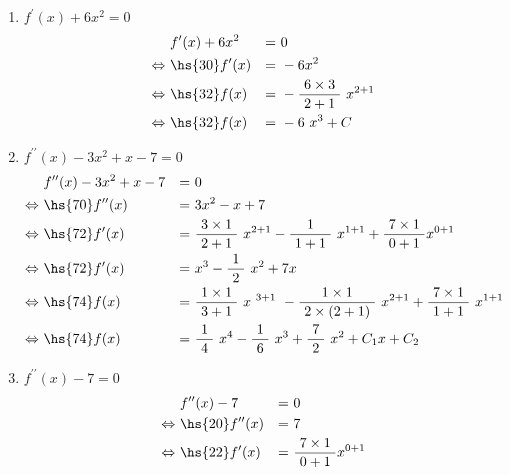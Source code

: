 \documentclass[a4paper,11pt]{ltjsarticle}
\begin{document}
\begin{enumerate}
  \item $f^{\prime}(x)+6x^{2}=0$
\begin{equation*}
  \begin{aligned}
                   \ & f^{\prime}(x)+6x^{2}  &=&\ 0 \\
    \Leftrightarrow\ & \hs{30} f^{\prime}(x) &=&\ -6x^{2} \\
    \Leftrightarrow\ & \hs{32} f(x)          &=&\ -\dfrac{6 \times 3}{\ 2+1\ }\ x^{2+1} \\
    \Leftrightarrow\ & \hs{32} f(x)          &=&\ -6\ x^{3}+C
  \end{aligned}
\end{equation*}

\clearpage

  \item $f^{\prime \prime}(x)-3x^{2}+x-7=0$
\begin{equation*}
  \begin{aligned}
                   \ & f^{\prime \prime}(x)-3x^{2}+x-7 &=&\ 0 \\
    \Leftrightarrow\ & \hs{70} f^{\prime \prime}(x)    &=&\ 3x^{2}-x+7 \\
    \Leftrightarrow\ & \hs{72} f^{\prime}(x)           &=&\ \dfrac{3 \times 1}{\ 2+1\ }\ x^{2+1}-\dfrac{1}{\ 1+1\ }\ x^{1+1}+\dfrac{7 \times 1}{\ 0+1\ }x^{0+1} \\
    \Leftrightarrow\ & \hs{72} f^{\prime}(x)           &=&\ x^{3}-\dfrac{1}{\ 2\ }\ x^{2}+7x \\
    \Leftrightarrow\ & \hs{74} f(x)                    &=&\ \dfrac{1 \times 1}{\ 3+1\ }\ x^{\ 3+1\ }-\dfrac{1 \times 1}{\ 2 \times (2+1)\ }\ x^{2+1}+\dfrac{7 \times 1} {\ 1+1\ }\ x^{1+1} \\
    \Leftrightarrow\ & \hs{74} f(x)                    &=&\ \dfrac{1}{\ 4\ }\ x^{4}-\dfrac{1}{\ 6\ }\ x^{3}+\dfrac{7}{\ 2\ }\ x^{2}+C_{1}x+C_{2}
  \end{aligned}
\end{equation*}
  \item $f^{\prime \prime}(x)-7=0$
\begin{equation*}
  \begin{aligned}
                   \ & f^{\prime \prime}(x)-7        &=&\ 0 \\
    \Leftrightarrow\ & \hs{20} f^{\prime \prime}(x)  &=&\ 7 \\
    \Leftrightarrow\ & \hs{22} f^{\prime}(x)         &=&\ \dfrac{7 \times 1}{\ 0+1\ }x^{0+1} \\

\end{aligned}
\end{equation*}
\end{enumerate}
\end{document}
